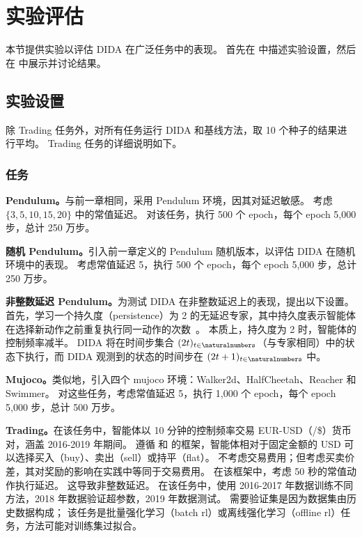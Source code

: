 \section{实验评估}
\label{sec:exp_imitation}
本节提供实验以评估 DIDA 在广泛任务中的表现。
首先在 中描述实验设置，然后在 中展示并讨论结果。



\subsection{实验设置}
\label{subsec:setting_exp_imitation}

除 Trading 任务外，对所有任务运行 DIDA 和基线方法，取 10 个种子的结果进行平均。
Trading 任务的详细说明如下。

\subsubsection{任务}
\label{subsubsec:tasks_imitation}

\noindent\textbf{Pendulum。}\indent 与前一章相同，采用 Pendulum 环境，因其对延迟敏感。
考虑 $\{3, 5, 10, 15, 20\}$ 中的常值延迟。
对该任务，执行 500 个 epoch，每个 epoch 5,000 步，总计 250 万步。

\noindent\textbf{随机 Pendulum。}\indent 引入前一章定义的 Pendulum 随机版本，以评估 DIDA 在随机环境中的表现。
考虑常值延迟 5，执行 500 个 epoch，每个 epoch 5,000 步，总计 250 万步。

\noindent\textbf{非整数延迟 Pendulum。}\indent 为测试 DIDA 在非整数延迟上的表现，提出以下设置。
首先，学习一个持久度（persistence）为 2 的无延迟专家，其中持久度表示智能体在选择新动作之前重复执行同一动作的次数~\cite{metelli2020control}。
本质上，持久度为 2 时，智能体的控制频率减半。
DIDA 将在时间步集合 $(2t)_{t\in\naturalnumbers}$（与专家相同）中的状态下执行，而 DIDA 观测到的状态的时间步在 $(2t+1)_{t\in\naturalnumbers}$ 中。

\noindent\textbf{Mujoco。}\indent 类似地，引入四个 mujoco 环境：Walker2d、HalfCheetah、Reacher 和 Swimmer。
对这些任务，考虑常值延迟 5，执行 1,000 个 epoch，每个 epoch 5,000 步，总计 500 万步。

\noindent\textbf{Trading。}\indent 在该任务中，智能体以 10 分钟的控制频率交易 EUR-USD（\texteuro/\$）货币对，涵盖 2016-2019 年期间。
遵循 \cite{bisi2020foreign} 和 \cite{riva2021learning} 的框架，智能体相对于固定金额的 USD 可以选择买入（buy）、卖出（sell）或持平（flat）。
不考虑交易费用；但考虑买卖价差，其对奖励的影响在实践中等同于交易费用。
在该框架中，考虑 50 秒的常值动作执行延迟。
这导致非整数延迟。
在该任务中，使用 2016-2017 年数据训练不同方法，2018 年数据验证超参数，2019 年数据测试。
需要验证集是因为数据集由历史数据构成；
该任务是批量强化学习（batch \gls{rl}）或离线强化学习（offline \gls{rl}）任务，方法可能对训练集过拟合。

